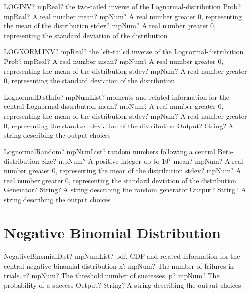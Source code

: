 \documentclass[12pt,a4paper,openany]{book}
\begin{document}
\begin{mpFunctionsExtract}
\mpWorksheetFunctionThreeNotImplemented
{LOGINV? mpReal? the two-tailed inverse of the Lognormal-distribution}
{Prob? mpReal? A real number}
{mean? mpNum? A real number greater 0, representing the mean of the distribution}
{stdev? mpNum? A real number greater 0, representing the standard deviation of the distribution}
\end{mpFunctionsExtract}

\begin{mpFunctionsExtract}
\mpWorksheetFunctionThreeNotImplemented
{LOGNORM.INV? mpReal? the left-tailed inverse of the Lognormal-distribution}
{Prob? mpReal? A real number}
{mean? mpNum? A real number greater 0, representing the mean of the distribution}
{stdev? mpNum? A real number greater 0, representing the standard deviation of the distribution}
\end{mpFunctionsExtract}

\begin{mpFunctionsExtract}
\mpFunctionThreeNotImplemented
{LognormalDistInfo? mpNumList? moments and related information for the central Lognormal-distribution}
{mean? mpNum? A real number greater 0, representing the mean of the distribution}
{stdev? mpNum? A real number greater 0, representing the standard deviation of the distribution}
{Output? String? A string describing the output choices}
\end{mpFunctionsExtract}

\begin{mpFunctionsExtract}
\mpFunctionFiveNotImplemented
{LognormalRandom? mpNumList? random numbers following a central Beta-distribution}
{Size? mpNum? A positive integer up to $10^7$}
{mean? mpNum? A real number greater 0, representing the mean of the distribution}
{stdev? mpNum? A real number greater 0, representing the standard deviation of the distribution}
{Generator? String? A string describing the random generator}
{Output? String? A string describing the output choices}
\end{mpFunctionsExtract}

\section{Negative Binomial Distribution}

\begin{mpFunctionsExtract}
\mpFunctionFourNotImplemented
{NegativeBinomialDist? mpNumList? pdf, CDF and related information for the central negative binomial distribution}
{x? mpNum? The number of failures in trials.}
{r? mpNum? The threshold number of successes.}
{p? mpNum? The probability of a success}
{Output? String? A string describing the output choices}
\end{mpFunctionsExtract}
\end{document}
